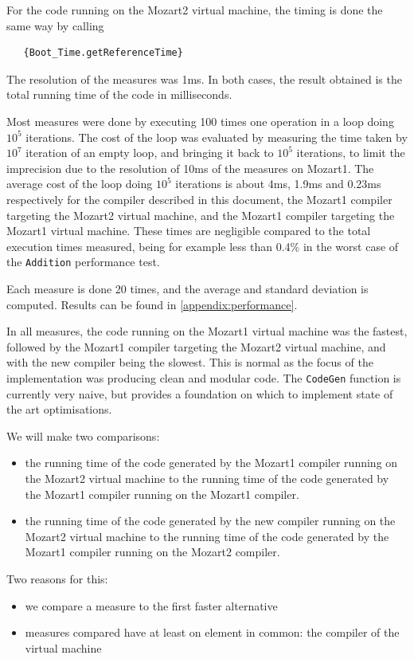 \documentclass[a4paper]{memoir}
\begin{document}
For the code running on the Mozart2 virtual machine, the timing is done
the same way by calling 
\begin{lstlisting}
   {Boot_Time.getReferenceTime}
\end{lstlisting}
The resolution of the measures was 1ms.
In both cases, the result obtained is the total running time of the code in milliseconds.

Most measures were done by executing 100 times one operation in a loop doing $10^5$ iterations.
The cost of the loop was evaluated by measuring the time taken by $10^7$ iteration of an empty loop, 
and bringing it back to $10^5$ iterations, to limit the imprecision due to the
resolution of 10ms of the measures on Mozart1.
The average cost of the loop doing $10^5$ iterations is about 4ms, 1.9ms and 0.23ms respectively for
the compiler described in this document, the Mozart1 compiler targeting the
Mozart2 virtual machine, and the Mozart1 compiler targeting the Mozart1
virtual machine. These times are negligible compared to the total execution
times measured, being for example less than 0.4\% in the worst case of the \lstinline!Addition!
performance test.


Each measure is done 20 times, and the average and standard deviation is
computed. Results can be found in \ref{appendix:performance}.

In all measures, the code running on the Mozart1 virtual machine was the
fastest, followed by the Mozart1 compiler targeting the Mozart2 virtual
machine, and with the new compiler being the slowest. This is normal as the 
focus of the implementation was producing clean and modular code. The \lstinline!CodeGen! function is currently very naive, but provides a foundation on which to implement state of the art optimisations.

We will make two comparisons:
\begin{itemize}
  \item the running time of the code generated by the Mozart1 compiler running
    on the Mozart2 virtual machine to the running time of the code generated by
    the Mozart1 compiler running on the Mozart1 compiler.
  \item the running time of the code generated by the new compiler running
    on the Mozart2 virtual machine to the running time of the code generated by
    the Mozart1 compiler running on the Mozart2 compiler.
\end{itemize}
Two reasons for this:
\begin{itemize}
  \item we compare a measure to the first faster alternative
  \item measures compared have at least on element in common: the compiler of
    the virtual machine
\end{itemize}
\end{document}
